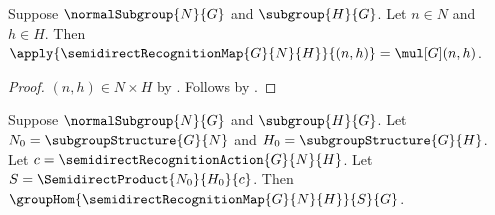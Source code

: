 \begin{proposition}\label{semidirect_recognition_map_apply}
    Suppose $\normalSubgroup{N}{G}$ and $\subgroup{H}{G}$.
    Let $n\in N$ and $h\in H$.
    Then
        $\apply{\semidirectRecognitionMap{G}{N}{H}}{(n,h)}=
            \mul[G](n,h)$.
\end{proposition}
\begin{proof}
    $(n,h)\in N\times H$ by .
    Follows by
        .
\end{proof}

\begin{theorem}\label{semidirect_recognition_map_hom}
    Suppose $\normalSubgroup{N}{G}$ and $\subgroup{H}{G}$.
    Let $N_0=\subgroupStructure{G}{N}$ and
        $H_0=\subgroupStructure{G}{H}$.
    Let $c=\semidirectRecognitionAction{G}{N}{H}$.
    Let $S=\SemidirectProduct{N_0}{H_0}{c}$.
    Then $\groupHom{\semidirectRecognitionMap{G}{N}{H}}{S}{G}$.
\end{theorem}
